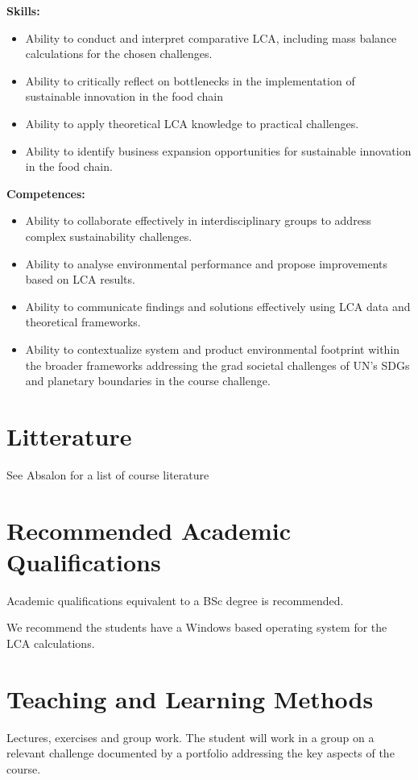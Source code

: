 \textbf{Skills:}
\begin{itemize}
    \item Ability to conduct and interpret comparative LCA, including mass balance calculations for the chosen challenges.
    \item Ability to critically reflect on bottlenecks in the implementation of sustainable innovation in the food chain
    \item Ability to apply theoretical LCA knowledge to practical challenges.
    \item Ability to identify business expansion opportunities for sustainable innovation in the food chain.
\end{itemize}

\textbf{Competences:}
\begin{itemize}
    \item Ability to collaborate effectively in interdisciplinary groups to address complex sustainability challenges.
    \item Ability to analyse environmental performance and propose improvements based on LCA results.
    \item Ability to communicate findings and solutions effectively using LCA data and theoretical frameworks.
    \item Ability to contextualize system and product environmental footprint within the broader frameworks addressing the grad societal challenges of UN's SDGs and planetary boundaries in the course challenge.
\end{itemize}


\section*{Litterature}
See Absalon for a list of course literature

\section*{Recommended Academic Qualifications}
Academic qualifications equivalent to a BSc degree is recommended.

We recommend the students have a Windows based operating system for the LCA calculations.


\section*{Teaching and Learning Methods}
Lectures, exercises and group work. The student will work in a group on a relevant challenge documented by a portfolio addressing the key aspects of the course.



